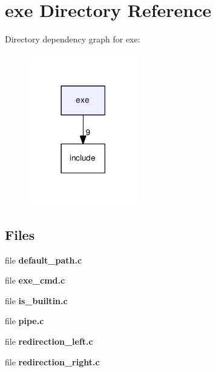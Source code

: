 \section{exe Directory Reference}
\label{dir_298cace015897d4784c970721217655e}
Directory dependency graph for exe\-:\nopagebreak
\begin{figure}[H]
\begin{center}
\leavevmode
\includegraphics[width=134pt]{dir_298cace015897d4784c970721217655e_dep}
\end{center}
\end{figure}
\subsection*{Files}
\begin{DoxyCompactItemize}
\item 
file {\bf default\-\_\-path.\-c}
\item 
file {\bf exe\-\_\-cmd.\-c}
\item 
file {\bf is\-\_\-builtin.\-c}
\item 
file {\bf pipe.\-c}
\item 
file {\bf redirection\-\_\-left.\-c}
\item 
file {\bf redirection\-\_\-right.\-c}
\end{DoxyCompactItemize}
